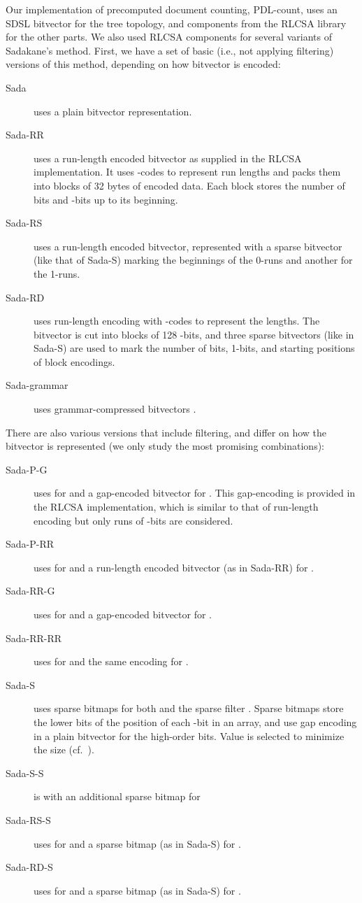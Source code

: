 \documentclass[11pt]{llncs}
\newcommand{\PDLcount}{\textsf{PDL-count}} \newcommand{\SadaR}{\textsf{Sada-RR}} \newcommand{\SadaPG}{\textsf{Sada-P-G}} \newcommand{\SadaPR}{\textsf{Sada-P-RR}} \newcommand{\SadaRG}{\textsf{Sada-RR-G}} \newcommand{\SadaRR}{\textsf{Sada-RR-RR}} \newcommand{\SadaG}{\textsf{Sada-grammar}} \newcommand{\sada}{\textsf{Sada}} \newcommand{\sadaR}{\textsf{Sada-RS}} \newcommand{\sadaRS}{\textsf{Sada-RS-S}} \newcommand{\sadaD}{\textsf{Sada-RD}} \newcommand{\sadaDS}{\textsf{Sada-RD-S}} \newcommand{\sadaS}{\textsf{Sada-S-S}} \newcommand{\sadaSS}{\textsf{Sada-S}} \newcommand{\wt}{\textsf{ILCP}}
\newcommand{\onebit}{\nobreakdash-bit}
\newcommand{\zerobit}{\nobreakdash-bit}
\begin{document}
Our implementation of precomputed document counting, \PDLcount, uses an SDSL
\cite{Gog2014b} bitvector for the tree topology, and components from the RLCSA
library for the other parts. We also used RLCSA components for several
variants of Sadakane's method. First, we have a set of basic (i.e., not
applying filtering) versions of this method, depending on how bitvector 
is encoded:
\begin{description}
\item[\sada] uses a plain bitvector representation.
\item[\SadaR] uses a run-length encoded bitvector as supplied in the RLCSA
implementation. It uses -codes to represent run lengths and packs
them into blocks of 32 bytes of encoded data. Each block stores the number
of bits and \onebit{}s up to its beginning.
\item[\sadaR] uses a run-length encoded bitvector, represented with a sparse
bitvector (like that of \sadaSS) marking the beginnings of the 0-runs and
another for the 1-runs.
\item[\sadaD] uses run-length encoding with -codes to represent the
lengths. The bitvector is cut into blocks of 128 \onebit{}s, and three sparse
bitvectors (like in \sadaSS) are used to mark the number of bits, 1-bits, and
starting positions of block encodings. 
\item[\SadaG{}] uses grammar-compressed bitvectors \cite{NO14}.
\end{description}

There are also various versions that include filtering, and differ on how
the bitvector  is represented (we only study the most promising
combinations):

\begin{description}
\item[\SadaPG] uses  for  and a gap-encoded bitvector
for . This gap-encoding is provided in the RLCSA implementation, which is
similar to that of run-length encoding but only runs of \zerobit{}s are
considered.
\item[\SadaPR] uses  for  and a run-length encoded 
bitvector (as in \SadaR) for .
\item[\SadaRG] uses  for  and a gap-encoded bitvector for .
\item[\SadaRR] uses  for  and the same encoding for .
\item[\sadaSS] uses sparse bitmaps for both  and the sparse filter .
Sparse bitmaps store the lower  bits of the position of each \onebit{} in an array, and use gap encoding 
in a plain bitvector for the high-order bits. Value  is selected to minimize
the size (cf.~\cite{OS07}).
\item[\sadaS] is  with an additional sparse bitmap for 
\item[\sadaRS] uses  for  and a sparse bitmap (as in \sadaSS) for
.
\item[\sadaDS] uses  for  and a sparse bitmap (as in \sadaSS) for
.
\end{description}
\end{document}
